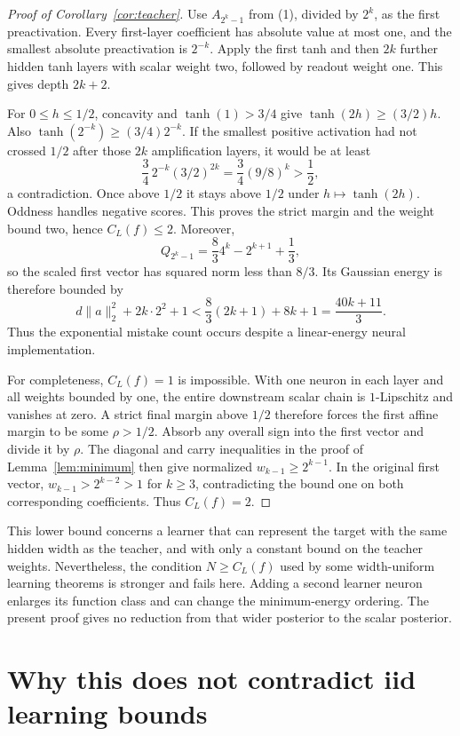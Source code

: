 \documentclass[11pt]{article}
\theoremstyle{remark}\newtheorem{remark}[theorem]{Remark}
\begin{document}
\begin{proof}[Proof of Corollary~\ref{cor:teacher}]
Use $A_{2^k-1}$ from (1), divided by $2^k$, as the first preactivation.
Every first-layer coefficient has absolute value at most one, and the
smallest absolute preactivation is $2^{-k}$. Apply the first tanh and
then $2k$ further hidden tanh layers with scalar weight two, followed by
readout weight one. This gives depth $2k+2$.

For $0\le h\le1/2$, concavity and $\tanh(1)>3/4$ give
$\tanh(2h)\ge(3/2)h$. Also $\tanh(2^{-k})\ge(3/4)2^{-k}$.
If the smallest positive activation had not crossed $1/2$ after those
$2k$ amplification layers, it would be at least
\[
 \frac34\,2^{-k}(3/2)^{2k}
     =\frac34(9/8)^k>\frac12,
\]
a contradiction. Once above $1/2$ it stays above $1/2$ under
$h\mapsto\tanh(2h)$. Oddness handles negative scores. This proves the
strict margin and the weight bound two, hence $C_L(f)\le2$. Moreover,
\[
 Q_{2^k-1}=\frac83 4^k-2^{k+1}+\frac13,
\]
so the scaled first vector has squared norm less than $8/3$. Its
Gaussian energy is therefore bounded by
\[
 d\|a\|_2^2+2k\cdot 2^2+1
   <\frac83(2k+1)+8k+1=\frac{40k+11}{3}.
\]
Thus the exponential mistake count occurs despite a linear-energy
neural implementation.

For completeness, $C_L(f)=1$ is impossible. With one neuron in each
layer and all weights bounded by one, the entire downstream scalar chain
is $1$-Lipschitz and vanishes at zero. A strict final margin above $1/2$
therefore forces the first affine margin to be some $\rho>1/2$.
Absorb any overall sign into the first vector and divide it by $\rho$.
The diagonal and carry inequalities in the proof of
Lemma~\ref{lem:minimum} then give normalized
$w_{k-1}\ge2^{k-1}$. In the original first vector,
$w_{k-1}>2^{k-2}>1$ for $k\ge3$, contradicting the bound one on both
corresponding coefficients. Thus $C_L(f)=2$.
\end{proof}

This lower bound concerns a learner that can represent the target with
the same hidden width as the teacher, and with only a constant bound on
the teacher weights. Nevertheless, the condition $N\ge C_L(f)$ used by
some width-uniform learning theorems is stronger and fails here. Adding a
second learner neuron enlarges its function class and can change the
minimum-energy ordering. The present proof gives no reduction from that
wider posterior to the scalar posterior.

\section{Why this does not contradict iid learning bounds}
\end{document}
